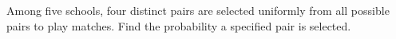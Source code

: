 Among five schools, four distinct pairs are selected uniformly from all possible pairs to play matches. Find the probability a specified pair is selected.
